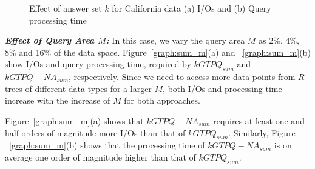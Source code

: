 \begin{figure}[htbp]
\begin{center}
\begin{tabular}{cc}
        \end{tabular}
    \caption{Effect of answer set $k$ for California data (a) I/Os and (b) Query processing time}
    \label{graph:sum_k}
  \end{center}
   \vspace{-6mm}
\end{figure}
\vspace*{10pt}

\textbf{\emph{Effect of Query Area $M$: }}In this case, we vary the query area $M$ as 2\%, 4\%, 8\% and 16\% of the data space. Figure~\ref{graph:sum_m}(a) and ~\ref{graph:sum_m}(b) show I/Os and query processing time, required by $kGTPQ_{sum}$ and $kGTPQ-NA_{sum}$, respectively. Since we need to access more data points from $R$-trees of different data types for a larger $M$, both I/Os and processing time increase with the increase of $M$ for both approaches.


Figure~\ref{graph:sum_m}(a) shows that $kGTPQ-NA_{sum}$ requires at least one and half orders of
magnitude more I/Os than that of $kGTPQ_{sum}$. Similarly, Figure ~\ref{graph:sum_m}(b)
shows that the processing time of $kGTPQ-NA_{sum}$ is on average one order of magnitude higher
than that of $kGTPQ_{sum}$.



